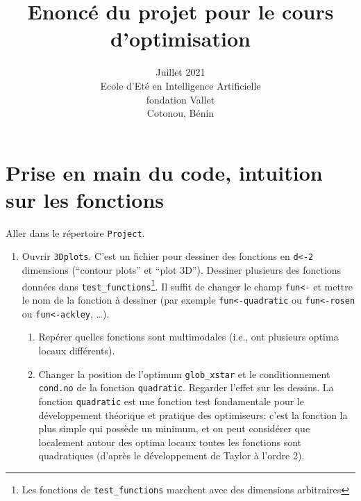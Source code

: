 \documentclass[12pt]{article}
\title{Enoncé du projet pour le cours d'optimisation}
\date{Juillet 2021 \\
Ecole d'Eté en Intelligence Artificielle \\
fondation Vallet\\
Cotonou, Bénin}
\author{}
\begin{document}
\maketitle

\section{Prise en main du code, intuition sur les fonctions}
Aller dans le répertoire \texttt{Project}. 
\begin{enumerate}

\item Ouvrir \texttt{3Dplots}. C'est un fichier pour dessiner des fonctions en \texttt{d<-2} dimensions (``contour plots'' et ``plot 3D''). 
Dessiner plusieurs des fonctions données dans \texttt{test\_functions}\footnote{Les fonctions de \texttt{test\_functions} marchent avec des dimensions arbitraires}.
Il suffit de changer le champ \texttt{fun<-} et mettre le nom de la fonction à dessiner
(par exemple \texttt{fun<-quadratic} ou \texttt{fun<-rosen} ou \texttt{fun<-ackley}, \ldots). \\
\begin{enumerate}
\item Repérer quelles fonctions sont multimodales (i.e., ont plusieurs optima locaux différents).
\item Changer la position de l'optimum \texttt{glob\_xstar} et le conditionnement \texttt{cond.no} de la fonction \texttt{quadratic}. Regarder l'effet sur les dessins. La fonction \texttt{quadratic} est une fonction test fondamentale pour le développement théorique et pratique des optimiseurs: 
c'est la fonction la plus simple qui possède un minimum, et on peut considérer que localement autour des optima locaux toutes les fonctions sont quadratiques (d'après le développement de Taylor à l'ordre 2).
\end{enumerate}


\end{enumerate}
\end{document}
